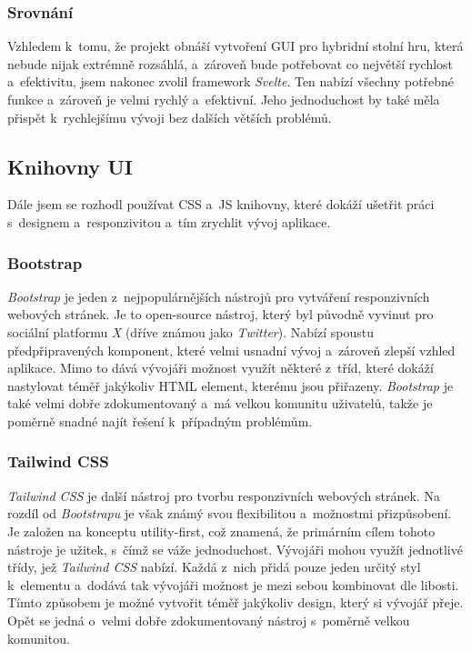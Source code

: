 \subsubsection*{Srovnání}
Vzhledem k~tomu, že projekt obnáší vytvoření GUI pro hybridní stolní hru, která nebude nijak extrémně rozsáhlá, a~zároveň bude potřebovat co největší rychlost a~efektivitu, jsem nakonec zvolil framework \textit{Svelte}. Ten nabízí všechny potřebné funkce a~zároveň je velmi rychlý a~efektivní. Jeho jednoduchost by také měla přispět k~rychlejšímu vývoji bez dalších větších problémů.

\pagebreak
\subsection{Knihovny UI}
Dále jsem se rozhodl používat CSS a~JS knihovny, které dokáží ušetřit práci s~designem a~responzivitou a~tím zrychlit vývoj aplikace.

\subsubsection*{Bootstrap}
\textit{Bootstrap} je jeden z~nejpopulárnějších nástrojů pro vytváření responzivních webových stránek. Je to open-source nástroj, který byl původně vyvinut pro sociální platformu \textit{X} (dříve známou jako \textit{Twitter}). Nabízí spoustu předpřipravených komponent, které velmi usnadní vývoj a~zároveň zlepší vzhled aplikace. Mimo to dává vývojáři možnost využít některé z~tříd, které dokáží nastylovat téměř jakýkoliv HTML element, kterému jsou přiřazeny. \textit{Bootstrap} je také velmi dobře zdokumentovaný a~má velkou komunitu uživatelů, takže je poměrně snadné najít řešení k~případným problémům. \cite{bootstrap,what_is_bootstrap}

\subsubsection*{Tailwind CSS}
\textit{Tailwind CSS} je další nástroj pro tvorbu responzivních webových stránek. Na rozdíl od \textit{Bootstrapu} je však známý svou flexibilitou a~možnostmi přizpůsobení. Je založen na konceptu utility-first, což znamená, že primárním cílem tohoto nástroje je užitek, s~čímž se váže jednoduchost. Vývojáři mohou využít jednotlivé třídy, jež \textit{Tailwind CSS} nabízí. Každá z~nich přidá pouze jeden určitý styl k~elementu a~dodává tak vývojáři možnost je mezi sebou kombinovat dle libosti. Tímto způsobem je možné vytvořit téměř jakýkoliv design, který si vývojář přeje. Opět se jedná o~velmi dobře zdokumentovaný nástroj s~poměrně velkou komunitou. \cite{tailwind_css}

